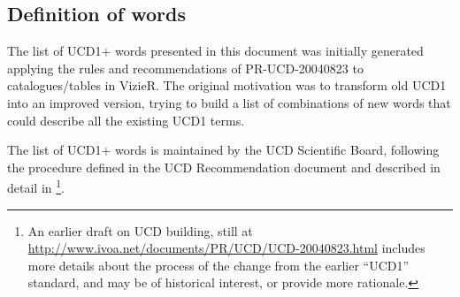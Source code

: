 \documentclass[11pt,a4paper]{ivoa}
\begin{document}
\subsection{Definition of words}
\label{sec:words}
The list of UCD1+ words presented in this document was initially generated applying the rules and 
recommendations of PR-UCD-20040823 to catalogues/tables in VizieR. The original motivation was to 
transform old UCD1 into an improved version, trying to build a list of combinations of new words that 
could describe all the existing UCD1 terms.

The list of UCD1+ words is maintained by the UCD Scientific Board, following the procedure defined 
in the UCD Recommendation document \citep{std:UCD} and described in detail in 
\citet{std:UCDMAINT-PR}\footnote{An earlier draft on UCD building, still at 
\url{http://www.ivoa.net/documents/PR/UCD/UCD-20040823.html} includes more details 
about the process of the change from the earlier ``UCD1'' standard, and may be of historical interest, or 
provide more rationale.}.
\end{document}
